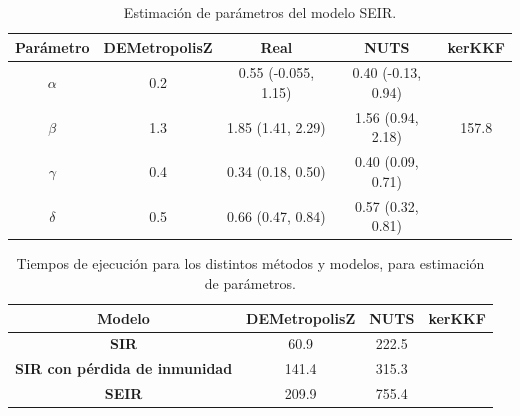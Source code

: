 \begin{table}[h!]
    \centering
    \caption{Estimación de parámetros del modelo SEIR.} 
    \begin{tabular}{|c|c|c|c|c|}
    \hline
    \textbf{Parámetro}& \textbf{DEMetropolisZ} & \textbf{Real} & \textbf{NUTS} & \textbf{kerKKF}  \\ \hline
    $\alpha$ & 0.2 & 0.55 (-0.055, 1.15) & 0.40 (-0.13, 0.94) &  \\ \hline
    $\beta$ & 1.3 & 1.85 (1.41, 2.29) & 1.56 (0.94, 2.18) & 157.8 \\ \hline
    $\gamma$ & 0.4 & 0.34 (0.18, 0.50) & 0.40 (0.09, 0.71) & \\ \hline
    $\delta$ & 0.5 & 0.66 (0.47, 0.84) & 0.57 (0.32, 0.81) & \\ \hline
    \end{tabular}
    \label{tab:SIR_params}
\end{table}

\begin{table}[h!]
    \centering
    \caption{Tiempos de ejecución para los distintos métodos y modelos, para estimación de parámetros.} 
    \begin{tabular}{|c|c|c|c|}
    \hline
    \textbf{Modelo} & \textbf{DEMetropolisZ} & \textbf{NUTS} & \textbf{kerKKF}  \\ \hline
    \textbf{SIR} & 60.9 & 222.5 &  \\ \hline
    \textbf{SIR con pérdida de inmunidad} & 141.4 & 315.3 & \\ \hline
    \textbf{SEIR} & 209.9 & 755.4 & \\ \hline
    \end{tabular}
    \label{tab:ex_times}
\end{table}